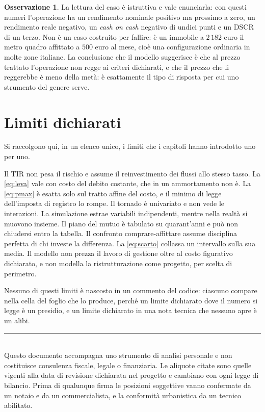 \documentclass[11pt,a4paper]{article}
\theoremstyle{definition}
\newtheorem{osservazione}[definizione]{Osservazione}
\theoremstyle{plain}
\begin{document}
\begin{osservazione}
La lettura del caso è istruttiva e vale enunciarla: con questi numeri l'operazione ha un rendimento nominale positivo ma prossimo a zero, un rendimento reale negativo, un \emph{cash on cash} negativo di undici punti e un DSCR di un terzo. Non è un caso costruito per fallire: è un immobile a $2\,182$ euro il metro quadro affittato a $500$ euro al mese, cioè una configurazione ordinaria in molte zone italiane. La conclusione che il modello suggerisce è che al prezzo trattato l'operazione non regge ai criteri dichiarati, e che il prezzo che li reggerebbe è meno della metà: è esattamente il tipo di risposta per cui uno strumento del genere serve.
\end{osservazione}

\section{Limiti dichiarati}

Si raccolgono qui, in un elenco unico, i limiti che i capitoli hanno introdotto uno per uno.

Il TIR non pesa il rischio e assume il reinvestimento dei flussi allo stesso tasso. La \eqref{eq:leva} vale con costo del debito costante, che in un ammortamento non è. La \eqref{eq:pmax} è esatta solo sul tratto affine del costo, e il minimo di legge dell'imposta di registro lo rompe. Il tornado è univariato e non vede le interazioni. La simulazione estrae variabili indipendenti, mentre nella realtà si muovono insieme. Il piano del mutuo è tabulato su quarant'anni e può non chiudersi entro la tabella. Il confronto comprare-affittare assume disciplina perfetta di chi investe la differenza. La \eqref{eq:scarto} collassa un intervallo sulla sua media. Il modello non prezza il lavoro di gestione oltre al costo figurativo dichiarato, e non modella la ristrutturazione come progetto, per scelta di perimetro.

Nessuno di questi limiti è nascosto in un commento del codice: ciascuno compare nella cella del foglio che lo produce, perché un limite dichiarato dove il numero si legge è un presidio, e un limite dichiarato in una nota tecnica che nessuno apre è un alibi.

\vfill
\noindent\rule{\linewidth}{0.4pt}\\[0.3em]
\small
Questo documento accompagna uno strumento di analisi personale e non costituisce consulenza fiscale, legale o finanziaria. Le aliquote citate sono quelle vigenti alla data di revisione dichiarata nel progetto e cambiano con ogni legge di bilancio. Prima di qualunque firma le posizioni soggettive vanno confermate da un notaio e da un commercialista, e la conformità urbanistica da un tecnico abilitato.
\end{document}
